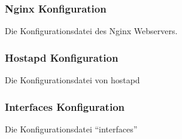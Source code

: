 \subsubsection*{Nginx Konfiguration}
\label{sec:NginxKonfiguration}
Die Konfigurationsdatei des Nginx Webservers. 



\subsubsection*{Hostapd Konfiguration}
\label{sec:HostapdSkript}
Die Konfigurationsdatei von hostapd


\subsubsection*{Interfaces Konfiguration}
\label{sec:NginxSkript}
Die Konfigurationsdatei ``interfaces''


